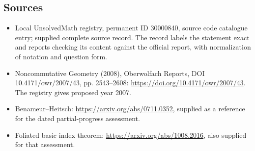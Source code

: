 \documentclass[11pt]{article}
\begin{document}
\subsection{Sources}
\begin{itemize}
\item Local UnsolvedMath registry, permanent ID 30000840, source code catalogue entry; supplied complete source record. The record labels the statement exact and reports checking its content against the official report, with normalization of notation and question form.
\item Noncommutative Geometry (2008), Oberwolfach Reports, DOI 10.4171/owr/2007/43, pp. 2543--2608: \url{https://doi.org/10.4171/owr/2007/43}. The registry gives proposed year 2007.
\item Benameur--Heitsch: \url{https://arxiv.org/abs/0711.0352}, supplied as a reference for the dated partial-progress assessment.
\item Foliated basic index theorem: \url{https://arxiv.org/abs/1008.2016}, also supplied for that assessment.
\end{itemize}
\end{document}
